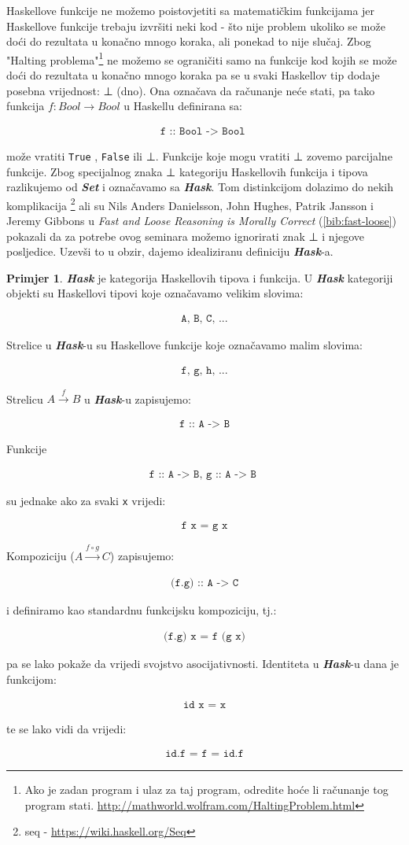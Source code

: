 \documentclass[11pt]{article}
\newcommand{\category}[1]{\textbf{\emph{#1}}}
\newcommand{\codei}[1]{
  {\lstinline[basicstyle=\ttfamily]{#1}}
}
\newcommand{\code}[1]{
  \begin{align*}
    \texttt{#1}
  \end{align*}
  }
\theoremstyle{definition}
\newtheorem{primjer}{Primjer}
\begin{document}
  Haskellove funkcije ne možemo poistovjetiti sa matematičkim funkcijama jer
  Haskellove funkcije trebaju izvršiti neki kod - što nije problem ukoliko se
  može doći do rezultata u konačno mnogo koraka, ali ponekad to nije slučaj. Zbog "Halting
  problema"\footnote{Ako je zadan program i ulaz za taj program, odredite hoće
    li računanje tog program stati.
    \url{http://mathworld.wolfram.com/HaltingProblem.html}} ne možemo se
  ograničiti samo na funkcije kod kojih se može doći do rezultata u konačno
  mnogo koraka pa se u svaki Haskellov tip dodaje posebna vrijednost: ⊥ (dno).
  Ona označava da računanje neće stati, pa tako funkcija $f:
  Bool \to Bool$  u Haskellu definirana sa:
  \code{
    f :: Bool -> Bool
  }
  može vratiti \codei{True}, \codei{False} ili ⊥. Funkcije koje mogu vratiti ⊥
  zovemo parcijalne funkcije.
  Zbog specijalnog znaka ⊥ kategoriju Haskellovih funkcija i tipova razlikujemo
  od \category{Set} i označavamo sa \category{Hask}. Tom distinkcijom dolazimo
  do nekih komplikacija \footnote{seq - \url{https://wiki.haskell.org/Seq}}
  ali su Nils Anders Danielsson, John Hughes, Patrik Jansson i Jeremy Gibbons
  u \textit{Fast and Loose Reasoning is Morally Correct} (\ref{bib:fast-loose}) pokazali
  da za potrebe ovog seminara možemo ignorirati znak ⊥ i njegove posljedice. Uzevši to u obzir, dajemo idealiziranu definiciju \category{Hask}-a.
  \begin{primjer} \category{Hask} je kategorija Haskellovih tipova i funkcija. U
  \category{Hask} kategoriji objekti su Haskellovi tipovi koje označavamo velikim
  slovima:
    \code{A, B, C, ...}
  Strelice u \category{Hask}-u su Haskellove funkcije koje označavamo malim
  slovima:
    \code{f, g, h, ...}
  Strelicu $A \xrightarrow{f} B$ u \category{Hask}-u zapisujemo:
    \code{f :: A -> B}
  Funkcije
    \code{
      f :: A -> B, g :: A -> B
      }
  su jednake ako za svaki \texttt{x} vrijedi:
    \code{ f x = g x }
  Kompoziciju ($A \xrightarrow{f \circ g} C$) zapisujemo:
    \code{(f.g) :: A -> C}
    i definiramo kao standardnu funkcijsku kompoziciju, tj.:
    \code{(f.g) x = f (g x)}
  pa se lako pokaže da vrijedi svojstvo asocijativnosti.
  Identiteta u \category{Hask}-u dana je funkcijom:
    \code{ id x = x }
  te se lako vidi da vrijedi:
    \code{ id.f = f = id.f }
  \end{primjer}
\end{document}
